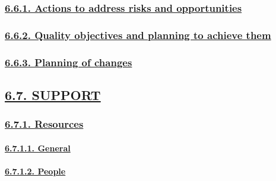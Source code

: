 \documentclass[
]{article}
\begin{document}
\hypertarget{actions-to-address-risks-and-opportunities}{%
\subsubsection{\texorpdfstring{\protect\hyperlink{actions-to-address-risks-and-opportunities-1}{6.6.1.
Actions to address risks and
opportunities}}{6.6.1. Actions to address risks and opportunities}}\label{actions-to-address-risks-and-opportunities}}

\hypertarget{quality-objectives-and-planning-to-achieve-them}{%
\subsubsection{\texorpdfstring{\protect\hyperlink{quality-objectives-and-planning-to-achieve-them-1}{6.6.2.
Quality objectives and planning to achieve
them}}{6.6.2. Quality objectives and planning to achieve them}}\label{quality-objectives-and-planning-to-achieve-them}}

\hypertarget{planning-of-changes}{%
\subsubsection{\texorpdfstring{\protect\hyperlink{planning-of-changes-1}{6.6.3.
Planning of
changes}}{6.6.3. Planning of changes}}\label{planning-of-changes}}

\hypertarget{support}{%
\subsection{\texorpdfstring{\protect\hyperlink{support-1}{6.7.
SUPPORT}}{6.7. SUPPORT}}\label{support}}

\hypertarget{resources}{%
\subsubsection{\texorpdfstring{\protect\hyperlink{resources-1}{6.7.1.
Resources}}{6.7.1. Resources}}\label{resources}}

\hypertarget{general-1}{%
\paragraph{\texorpdfstring{\protect\hyperlink{general-10}{6.7.1.1.
General}}{6.7.1.1. General}}\label{general-1}}

\hypertarget{people}{%
\paragraph{\texorpdfstring{\protect\hyperlink{people-1}{6.7.1.2.
People}}{6.7.1.2. People}}\label{people}}
\end{document}

